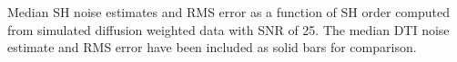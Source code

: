 \label{fig:simGraph} Median SH noise estimates and RMS error as a function of SH order computed from simulated diffusion weighted data with SNR of 25. The median DTI noise estimate and RMS error have been included as solid bars for comparison.